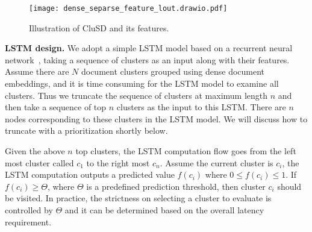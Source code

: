 \begin{figure}[htbp]
    \texttt{[image: dense\_separse\_feature\_lout.drawio.pdf]}
    \vspace*{-1mm}
    \caption{Illustration of CluSD and its features.}
    \label{fig:features}
     \vspace*{-5mm}
\end{figure}

{\bf LSTM design.}
We adopt a simple LSTM model based on  a recurrent neural network~\cite{hochreiter1997long}, 
taking a sequence  of clusters as an input along with their features.
Assume there are $N$ document clusters grouped using dense document embeddings, and 
it is time consuming for the LSTM model to examine all clusters. Thus
 we truncate the sequence of clusters at maximum length $n$ and then take a sequence of top $n$ clusters as the input to this LSTM. 
There are  $n$ nodes corresponding to these clusters in the LSTM model.
We will discuss how to truncate with a prioritization shortly below.






Given the above  $n$ top clusters,
 the LSTM computation flow goes from the left most cluster called $c_1$ to the right most $c_{n}$.
Assume the current cluster is $c_i$,  
the LSTM computation outputs a predicted value $f(c_i)$ where $0\leq f(c_i) \leq 1$.
If $f(c_i) \ge \Theta$, where $\Theta$ is a predefined prediction threshold, then cluster  $c_i$ should be visited. In practice, the strictness on selecting a cluster to evaluate is controlled by $\Theta$ and it can be determined based on the overall latency requirement. 

